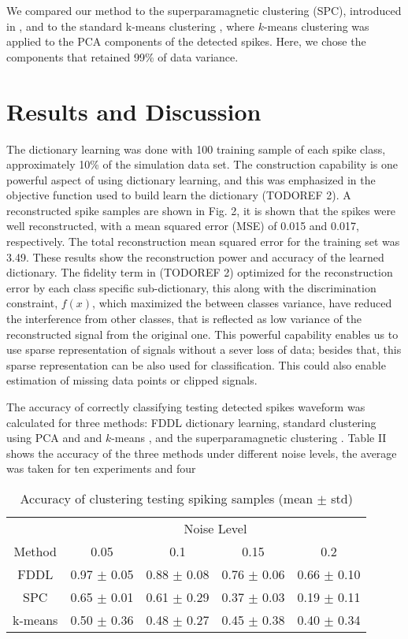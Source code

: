 \documentclass[conference]{IEEEtran}
\begin{document}
	We compared our method to the superparamagnetic clustering (SPC), introduced in \cite{quiroga2004unsupervised}, and to the standard k-means clustering \cite{lewicki1998review}, where $k$-means clustering was applied to the PCA components of the detected spikes. Here, we chose the components that retained 99\% of data variance.
	
 	\section{Results and Discussion}
	The dictionary learning was done with 100 training sample of each spike class, approximately 10\% of the simulation data set. The construction capability is one powerful aspect of using dictionary learning, and this was emphasized in the objective function used to build learn the dictionary (TODOREF 2). A reconstructed spike samples are shown in Fig. 2, it is shown that the spikes were well reconstructed, with a mean squared error (MSE) of 0.015 and 0.017, respectively. The total reconstruction mean squared error for the training set was 3.49. These results show the reconstruction power and accuracy of the learned dictionary. The fidelity term in (TODOREF 2) optimized for the reconstruction error by each class specific sub-dictionary, this along with the discrimination constraint, $f(x)$, which maximized the between classes variance, have reduced the interference from other classes, that is reflected as low variance of the reconstructed signal from the original one. This powerful capability enables us to use sparse representation of signals without a sever loss of data; besides that, this sparse representation can be also used for classification. This could also enable estimation of missing data points or clipped signals.
	
	The accuracy of correctly classifying testing detected spikes waveform was calculated for three methods: FDDL dictionary learning, standard clustering using PCA and and $k$-means \cite{lewicki1998review}, and the superparamagnetic clustering \cite{quiroga2004unsupervised}. Table II shows the accuracy of the three methods under different noise levels, the average was taken for ten experiments and four
	
	\begin{table}
		\caption{Accuracy of clustering testing spiking samples (mean $\pm$ std)}
		\label{tab:acc_clust}
		\begin{tabularx}{\columnwidth}{c c c c c}
			\cmidrule{2-5}
			& \multicolumn{4}{c}{Noise Level} \\
			\cmidrule{2-5}
			Method & 0.05 & 0.1 & 0.15 & 0.2 \\
			\cmidrule[0.7pt]{1-5}
			FDDL & 0.97 $\pm$ 0.05 & 0.88 $\pm$ 0.08 & 0.76 $\pm$ 0.06 & 0.66 $\pm$ 0.10 \\
			SPC & 0.65 $\pm$ 0.01 & 0.61 $\pm$ 0.29 & 0.37 $\pm$ 0.03 & 0.19 $\pm$ 0.11 \\
			k-means & 0.50 $\pm$ 0.36 & 0.48 $\pm$ 0.27 & 0.45 $\pm$ 0.38 & 0.40 $\pm$ 0.34 \\
			\cmidrule[0.7pt]{1-5}
		\end{tabularx}
	\end{table}
\end{document}
